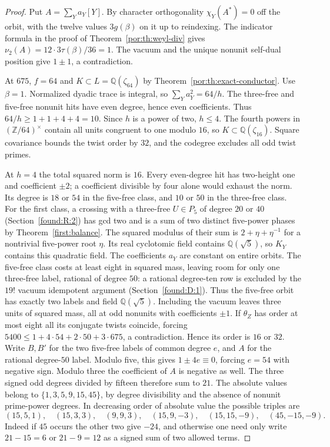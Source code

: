 \documentclass[11pt,a4paper]{article}
\numberwithin{equation}{section}
\theoremstyle{remark}
\newcommand{\ZZ}{\mathbb Z}
\newcommand{\QQ}{\mathbb Q}
\begin{document}
\begin{proof}
Put $A=\sum_Ya_Y[Y]$. By character orthogonality $\chi_Y(A^*)=0$ off the orbit, with the twelve values $3g(\beta)$ on it up to reindexing. The indicator formula in the proof of Theorem~\ref{por:th:weyl-div} gives $\nu_2(A)=12\cdot3\tau(\beta)/36=1$. The vacuum and the unique nonunit self-dual position give $1\pm1$, a contradiction.

At $675$, $f=64$ and $K\subset L=\QQ(\zeta_{64})$ by Theorem~\ref{por:th:exact-conductor}. Use $\beta=1$. Normalized dyadic trace is integral, so $\sum_Y a_Y^2=64/h$. The three-free and five-free nonunit hits have even degree, hence even coefficients. Thus $64/h\ge1+1+4+4=10$. Since $h$ is a power of two, $h\le4$. The fourth powers in $(\ZZ/64)^\times$ contain all units congruent to one modulo $16$, so $K\subset\QQ(\zeta_{16})$. Square covariance bounds the twist order by $32$, and the codegree excludes all odd twist primes.

At $h=4$ the total squared norm is $16$. Every even-degree hit has two-height one and coefficient $\pm2$; a coefficient divisible by four alone would exhaust the norm. Its degree is $18$ or $54$ in the five-free class, and $10$ or $50$ in the three-free class. For the first class, a crossing with a three-free $U\in P_5$ of degree $20$ or $40$ (Section~\ref{found:R:2}) has gcd two and is a sum of two distinct five-power phases by Theorem~\ref{first:balance}. The squared modulus of their sum is $2+\eta+\eta^{-1}$ for a nontrivial five-power root $\eta$. Its real cyclotomic field contains $\QQ(\sqrt5)$, so $K_Y$ contains this quadratic field. The coefficients $a_Y$ are constant on entire orbits. The five-free class costs at least eight in squared mass, leaving room for only one three-free label, rational of degree $50$: a rational degree-ten row is excluded by the $19!$ vacuum idempotent argument (Section~\ref{found:D:1}). Thus the five-free orbit has exactly two labels and field $\QQ(\sqrt5)$. Including the vacuum leaves three units of squared mass, all at odd nonunits with coefficients $\pm1$. If $\theta_Z$ has order at most eight all its conjugate twists coincide, forcing $5400\le1+4\cdot54+2\cdot50+3\cdot675$, a contradiction. Hence its order is $16$ or $32$.
Write $B,B'$ for the two five-free labels of common degree $e$, and $A$ for the rational degree-$50$ label. Modulo five, this gives $1\pm4e\equiv0$, forcing $e=54$ with negative sign. Modulo three the coefficient of $A$ is negative as well. The three signed odd degrees divided by fifteen therefore sum to $21$. The absolute values belong to $\{1,3,5,9,15,45\}$, by degree divisibility and the absence of nonunit prime-power degrees. In decreasing order of absolute value the possible triples are
\[
(15,5,1),\quad (15,3,3),\quad(9,9,3),\quad
(15,9,-3),\quad(15,15,-9),\quad(45,-15,-9).
\]
Indeed if $45$ occurs the other two give $-24$, and otherwise one need only write $21-15=6$ or $21-9=12$ as a signed sum of two allowed terms.


\end{proof}
\end{document}

